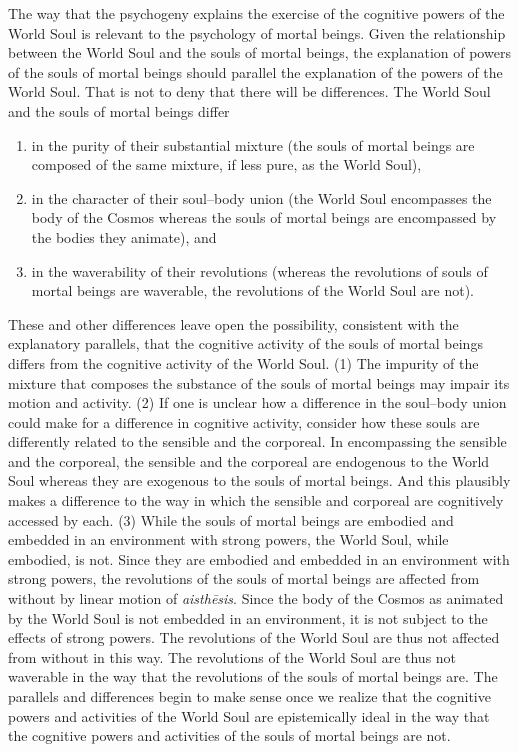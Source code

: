 The way that the psychogeny explains the exercise of the cognitive powers of the World Soul is relevant to the psychology of mortal beings. Given the relationship between the World Soul and the souls of mortal beings, the explanation of powers of the souls of mortal beings should parallel the explanation of the powers of the World Soul. That is not to deny that there will be differences. The World Soul and the souls of mortal beings differ 
\begin{enumerate}[(1)]
	\item in the purity of their substantial mixture (the souls of mortal beings are composed of the same mixture, if less pure, as the World Soul),
	\item in the character of their soul--body union (the World Soul encompasses the body of the Cosmos whereas the souls of mortal beings are encompassed by the bodies they animate), and
	\item in the waverability of their revolutions (whereas the revolutions of souls of mortal beings are waverable, the revolutions of the World Soul are not).
\end{enumerate}
These and other differences leave open the possibility, consistent with the explanatory parallels, that the cognitive activity of the souls of mortal beings differs from the cognitive activity of the World Soul. (1) The impurity of the mixture that composes the substance of the souls of mortal beings may impair its motion and activity. (2) If one is unclear how a difference in the soul--body union could make for a difference in cognitive activity, consider how these souls are differently related to the sensible and the corporeal. In encompassing the sensible and the corporeal, the sensible and the corporeal are endogenous to the World Soul whereas they are exogenous to the souls of mortal beings. And this plausibly makes a difference to the way in which the sensible and corporeal are cognitively accessed by each. (3) While the souls of mortal beings are embodied and embedded in an environment with strong powers, the World Soul, while embodied, is not. Since they are embodied and embedded in an environment with strong powers, the revolutions of the souls of mortal beings are affected from without by linear motion of \emph{aisthēsis}. Since the body of the Cosmos as animated by the World Soul is not embedded in an environment, it is not subject to the effects of strong powers. The revolutions of the World Soul are thus not affected from without in this way. The revolutions of the World Soul are thus not waverable in the way that the revolutions of the souls of mortal beings are. The parallels and differences begin to make sense once we realize that the cognitive powers and activities of the World Soul are epistemically ideal in the way that the cognitive powers and activities of the souls of mortal beings are not.

